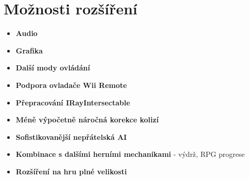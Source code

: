 \section{Možnosti rozšíření}

\begin{itemize}
    \item \textbf{Audio}
    \item \textbf{Grafika}
    \item \textbf{Další mody ovládání}
    \item \textbf{Podpora ovladače Wii Remote}
    \item \textbf{Přepracování IRayIntersectable}
    \item \textbf{Méně výpočetně náročná korekce kolizí}
    \item \textbf{Sofistikovanější nepřátelská AI}
    \item \textbf{Kombinace s dalšími herními mechanikami} - výdrž, RPG progrese
    \item \textbf{Rozšíření na hru plné velikosti}
\end{itemize}